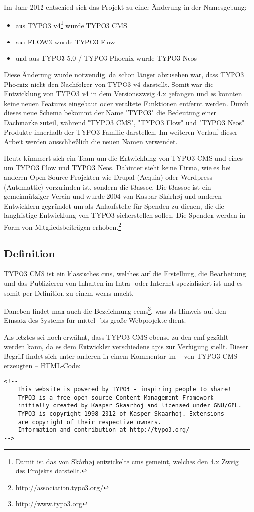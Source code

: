 Im Jahr 2012 entschied sich das Projekt zu einer Änderung in der Namesgebung:
\begin{itemize}
	\item aus TYPO3 v4\footnote{Damit ist das von Skårhøj entwickelte \gls{cms} gemeint, welches den 4.x Zweig des Projekts darstellt.} wurde TYPO3 CMS
	\item aus FLOW3 wurde TYPO3 Flow
	\item und aus TYPO3 5.0 / TYPO3 Phoenix wurde TYPO3 Neos
\end{itemize}

Diese Änderung wurde notwendig, da schon länger abzusehen war, dass TYPO3 Phoenix nicht den Nachfolger von TYPO3 v4 darstellt. Somit war die Entwicklung von TYPO3 v4 in dem Versionszweig 4.x gefangen und es konnten keine neuen Features eingebaut oder veraltete Funktionen entfernt werden. Durch dieses neue Schema bekommt der Name "TYPO3" die Bedeutung einer Dachmarke zuteil, während "TYPO3 CMS", "TYPO3 Flow" und "TYPO3 Neos" Produkte innerhalb der TYPO3 Familie darstellen. Im weiteren Verlauf dieser Arbeit werden ausschließlich die neuen Namen verwendet.

Heute kümmert sich ein Team um die Entwicklung von TYPO3 CMS und eines um TYPO3 Flow und TYPO3 Neos. Dahinter steht keine Firma, wie es bei anderen Open Source Projekten wie Drupal (Acquia) oder Wordpress (Automattic) vorzufinden ist, sondern die \gls{t3assoc}. Die \gls{t3assoc} ist ein gemeinnütziger Verein und wurde 2004 von Kaspar Skårhøj und anderen Entwicklern gegründet um als Anlaufstelle für Spenden zu dienen, die die langfristige Entwicklung von TYPO3 sicherstellen sollen. Die Spenden werden in Form von Mitgliedsbeiträgen erhoben.\footnote{http://association.typo3.org/}

\subsection{Definition}
TYPO3 CMS ist ein klassisches \gls{cms}, welches auf die Erstellung, die Bearbeitung und das Publizieren von Inhalten im Intra- oder Internet spezialisiert ist und es somit per Definition zu einem \gls{wcms} macht.

Daneben findet man auch die Bezeichnung \gls{ecms}\footnote{http://www.typo3.org}, was als Hinweis auf den Einsatz des Systems für mittel- bis große Webprojekte dient.

Als letztes sei noch erwähnt, dass TYPO3 CMS ebenso zu den \gls{cmf} gezählt werden kann, da es dem Entwickler verschiedene \gls{api}s zur Verfügung stellt. Dieser Begriff findet sich unter anderen in einem Kommentar im – von TYPO3 CMS erzeugten – HTML-Code:
\begin{verbatim}
<!--
    This website is powered by TYPO3 - inspiring people to share!
    TYPO3 is a free open source Content Management Framework
    initially created by Kasper Skaarhoj and licensed under GNU/GPL.
    TYPO3 is copyright 1998-2012 of Kasper Skaarhoj. Extensions
    are copyright of their respective owners.
    Information and contribution at http://typo3.org/
-->
\end{verbatim}

